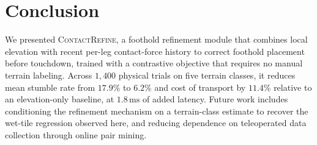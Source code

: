 \section{Conclusion}
We presented \textsc{ContactRefine}, a foothold refinement module that combines local
elevation with recent per-leg contact-force history to correct foothold placement before
touchdown, trained with a contrastive objective that requires no manual terrain labeling.
Across $1{,}400$ physical trials on five terrain classes, it reduces mean stumble rate from
$17.9\%$ to $6.2\%$ and cost of transport by $11.4\%$ relative to an elevation-only baseline,
at $1.8\,\text{ms}$ of added latency. Future work includes conditioning the refinement
mechanism on a terrain-class estimate to recover the wet-tile regression observed here, and
reducing dependence on teleoperated data collection through online pair mining.
